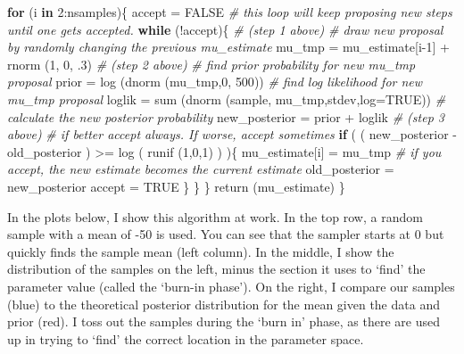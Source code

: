 \documentclass[
]{book}
\newenvironment{Shaded}{\begin{snugshade}}{\end{snugshade}}
\newcommand{\AttributeTok}[1]{\textcolor[rgb]{0.77,0.63,0.00}{#1}}
\newcommand{\CommentTok}[1]{\textcolor[rgb]{0.56,0.35,0.01}{\textit{#1}}}
\newcommand{\ConstantTok}[1]{\textcolor[rgb]{0.00,0.00,0.00}{#1}}
\newcommand{\ControlFlowTok}[1]{\textcolor[rgb]{0.13,0.29,0.53}{\textbf{#1}}}
\newcommand{\DecValTok}[1]{\textcolor[rgb]{0.00,0.00,0.81}{#1}}
\newcommand{\FunctionTok}[1]{\textcolor[rgb]{0.00,0.00,0.00}{#1}}
\newcommand{\NormalTok}[1]{#1}
\newcommand{\OtherTok}[1]{\textcolor[rgb]{0.56,0.35,0.01}{#1}}
\newcommand{\SpecialCharTok}[1]{\textcolor[rgb]{0.00,0.00,0.00}{#1}}
\begin{document}
\begin{Shaded}
\begin{Highlighting}[]
  \ControlFlowTok{for}\NormalTok{ (i }\ControlFlowTok{in} \DecValTok{2}\SpecialCharTok{:}\NormalTok{nsamples)\{}
\NormalTok{    accept }\OtherTok{=} \ConstantTok{FALSE}
    \CommentTok{\# this loop will keep proposing new steps until one gets accepted. }
    \ControlFlowTok{while}\NormalTok{ (}\SpecialCharTok{!}\NormalTok{accept)\{}
      \CommentTok{\# (step 1 above)}
      \CommentTok{\# draw new proposal by randomly changing the previous mu\_estimate}
\NormalTok{      mu\_tmp }\OtherTok{=}\NormalTok{ mu\_estimate[i}\DecValTok{{-}1}\NormalTok{] }\SpecialCharTok{+} \FunctionTok{rnorm}\NormalTok{ (}\DecValTok{1}\NormalTok{, }\DecValTok{0}\NormalTok{, .}\DecValTok{3}\NormalTok{)}
      \CommentTok{\# (step 2 above)}
      \CommentTok{\# find prior probability for new mu\_tmp proposal}
\NormalTok{      prior }\OtherTok{=} \FunctionTok{log}\NormalTok{ (}\FunctionTok{dnorm}\NormalTok{ (mu\_tmp,}\DecValTok{0}\NormalTok{, }\DecValTok{500}\NormalTok{))}
      \CommentTok{\# find log likelihood for new mu\_tmp proposal}
\NormalTok{      loglik }\OtherTok{=} \FunctionTok{sum}\NormalTok{ (}\FunctionTok{dnorm}\NormalTok{ (sample, mu\_tmp,stdev,}\AttributeTok{log=}\ConstantTok{TRUE}\NormalTok{))}
      \CommentTok{\# calculate the new posterior probability}
\NormalTok{      new\_posterior }\OtherTok{=}\NormalTok{ prior }\SpecialCharTok{+}\NormalTok{ loglik}
      \CommentTok{\# (step 3 above)}
      \CommentTok{\# if better accept always. If worse, accept sometimes}
      \ControlFlowTok{if}\NormalTok{ ( ( new\_posterior }\SpecialCharTok{{-}}\NormalTok{ old\_posterior ) }\SpecialCharTok{\textgreater{}=} \FunctionTok{log}\NormalTok{ ( }\FunctionTok{runif}\NormalTok{ (}\DecValTok{1}\NormalTok{,}\DecValTok{0}\NormalTok{,}\DecValTok{1}\NormalTok{) ) )\{}
\NormalTok{        mu\_estimate[i] }\OtherTok{=}\NormalTok{ mu\_tmp}
        \CommentTok{\# if you accept, the new estimate becomes the current estimate}
\NormalTok{        old\_posterior }\OtherTok{=}\NormalTok{ new\_posterior}
\NormalTok{        accept }\OtherTok{=} \ConstantTok{TRUE}
\NormalTok{      \}}
\NormalTok{    \}}
\NormalTok{  \} }
  \FunctionTok{return}\NormalTok{ (mu\_estimate)}
\NormalTok{\}}
\end{Highlighting}
\end{Shaded}

In the plots below, I show this algorithm at work. In the top row, a random sample with a mean of -50 is used. You can see that the sampler starts at 0 but quickly finds the sample mean (left column). In the middle, I show the distribution of the samples on the left, minus the section it uses to `find' the parameter value (called the `burn-in phase'). On the right, I compare our samples (blue) to the theoretical posterior distribution for the mean given the data and prior (red). I toss out the samples during the `burn in' phase, as there are used up in trying to `find' the correct location in the parameter space.
\end{document}
